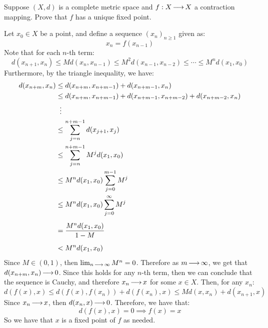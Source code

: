 \begin{qu}[title=Banach Fixed Point Theorem,num=11.1]
    Suppose $ (X, d) $ is a complete metric space and $ f : X \operatorname{\longrightarrow} X $ a
    contraction mapping. Prove that $ f $ has a unique fixed point.
\end{qu}

\begin{soln}
    Let $ x_{0} \in X $ be a point, and define a sequence $ (x_{n})_{n \geq 1} $
    given as:
    \begin{equation*}
        x_{n} = f(x_{n-1})
    \end{equation*}
    Note that for each $ n $-th term:
    \begin{equation*}
        d(x_{n+1}, x_{n}) \leq Md(x_{n}, x_{n-1}) \leq M^{2}d(x_{n-1}, x_{n-2})
        \leq \cdots \leq M^{n}d(x_{1}, x_{0})
    \end{equation*}
    Furthermore, by the triangle inequality, we have:
    \begin{align*}
        d(x_{n+m}, x_{n}) & \leq d(x_{n+m}, x_{n+m-1}) + d(x_{n+m-1}, x_{n}) \\
                          & \leq d(x_{n+m}, x_{n+m-1}) + d(x_{n+m-1}, x_{n+m-2})
                          + d(x_{n+m-2}, x_{n}) \\
                          & \ \: \vdots \\
                          & \leq \sum_{j=n}^{n+m-1} d(x_{j+1}, x_{j}) \\
                          & \leq \sum_{j=n}^{n+m-1} M^{j} d(x_{1}, x_{0}) \\
                          & \leq M^{n}d(x_{1}, x_{0})\sum_{j=0}^{m-1} M^{j} \\
                          & \leq M^{n}d(x_{1}, x_{0})\sum_{j=0}^{\infty}M^{j}
                          \vsp
                          & = \frac{M^{n}d(x_{1}, x_{0})}{1 - M} \vsp
                          & < M^{n}d(x_{1}, x_{0})
    \end{align*}
    Since $ M \in (0, 1) $, then $ \lim_{n \operatorname{\longrightarrow} \infty} M^{n} = 0 $.
    Therefore as $ m \operatorname{\longrightarrow} \infty $, we get that $ d(x_{n+m}, x_{n})
    \operatorname{\longrightarrow} 0 $. Since this holds for any $ n $-th term, then we can conclude
    that the sequence is Cauchy, and therefore $ x_{n} \operatorname{\longrightarrow} x $ for some
    $ x \in X $. Then, for any $ x_{n} $:
    \begin{equation*}
        d(f(x), x) \leq d(f(x), f(x_{n})) + d(f(x_{n}), x) \leq Md(x, x_{n})
        + d(x_{n+1}, x)
    \end{equation*}
    Since $ x_{n} \operatorname{\longrightarrow} x $, then $ d(x_{n}, x) \operatorname{\longrightarrow} 0 $.
    Therefore, we have that:
    \begin{equation*}
        d(f(x), x) = 0 \implies f(x) = x
    \end{equation*}
    So we have that $ x $ is a fixed point of $ f $ as needed.
\end{soln}

